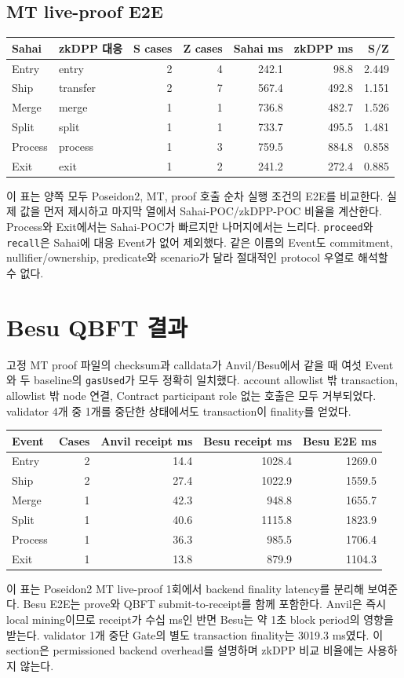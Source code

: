 \documentclass[10pt]{article}
\begin{document}
\subsection{MT live-proof E2E}
\begin{longtable}{llrrrrr}
\toprule Sahai & zkDPP 대응 & S cases & Z cases & Sahai ms & zkDPP ms & S/Z\\
\midrule\endhead
Entry & entry & 2 & 4 & 242.1 & 98.8 & 2.449\\
Ship & transfer & 2 & 7 & 567.4 & 492.8 & 1.151\\
Merge & merge & 1 & 1 & 736.8 & 482.7 & 1.526\\
Split & split & 1 & 1 & 733.7 & 495.5 & 1.481\\
Process & process & 1 & 3 & 759.5 & 884.8 & 0.858\\
Exit & exit & 1 & 2 & 241.2 & 272.4 & 0.885\\
\bottomrule\end{longtable}
이 표는 양쪽 모두 Poseidon2, MT, proof 호출 순차 실행 조건의 E2E를 비교한다. 실제 값을 먼저 제시하고 마지막 열에서 Sahai-POC/zkDPP-POC 비율을 계산한다. Process와 Exit에서는 Sahai-POC가 빠르지만 나머지에서는 느리다. \texttt{proceed}와 \texttt{recall}은 Sahai에 대응 Event가 없어 제외했다. 같은 이름의 Event도 commitment, nullifier/ownership, predicate와 scenario가 달라 절대적인 protocol 우열로 해석할 수 없다.
\section{Besu QBFT 결과}
고정 MT proof 파일의 checksum과 calldata가 Anvil/Besu에서 같을 때 여섯 Event와 두 baseline의 \texttt{gasUsed}가 모두 정확히 일치했다. account allowlist 밖 transaction, allowlist 밖 node 연결, Contract participant role 없는 호출은 모두 거부되었다. validator 4개 중 1개를 중단한 상태에서도 transaction이 finality를 얻었다.
\begin{longtable}{lrrrr}
\toprule Event & Cases & Anvil receipt ms & Besu receipt ms & Besu E2E ms\\
\midrule\endhead
Entry & 2 & 14.4 & 1028.4 & 1269.0\\
Ship & 2 & 27.4 & 1022.9 & 1559.5\\
Merge & 1 & 42.3 & 948.8 & 1655.7\\
Split & 1 & 40.6 & 1115.8 & 1823.9\\
Process & 1 & 36.3 & 985.5 & 1706.4\\
Exit & 1 & 13.8 & 879.9 & 1104.3\\
\bottomrule\end{longtable}
이 표는 Poseidon2 MT live-proof 1회에서 backend finality latency를 분리해 보여준다. Besu E2E는 prove와 QBFT submit-to-receipt를 함께 포함한다. Anvil은 즉시 local mining이므로 receipt가 수십 ms인 반면 Besu는 약 1초 block period의 영향을 받는다. validator 1개 중단 Gate의 별도 transaction finality는 3019.3 ms였다. 이 section은 permissioned backend overhead를 설명하며 zkDPP 비교 비율에는 사용하지 않는다.
\end{document}
